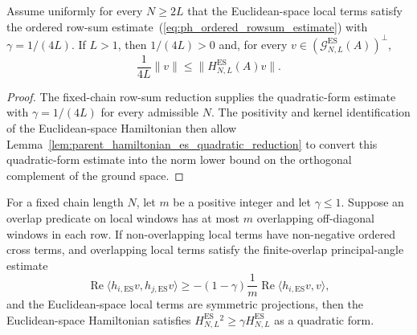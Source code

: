 \begin{lemma}
    \label{lem:parent_hamiltonian_ordered_rowsum_gap}
    \leanok
    Assume uniformly for every $N\ge2L$ that the Euclidean-space local terms
    satisfy the ordered row-sum estimate~(\ref{eq:ph_ordered_rowsum_estimate})
    with $\gamma=1/(4L)$. If $L>1$, then
    $1/(4L)>0$ and, for every
    $v\in(\mathcal G_{N,L}^{\mathrm{ES}}(A))^\perp$,
    \[
        \frac{1}{4L}\|v\|\le
        \|H_{N,L}^{\mathrm{ES}}(A)v\|.
    \]
\end{lemma}

\begin{proof}
    \leanok
    The fixed-chain row-sum reduction supplies the quadratic-form estimate with
    $\gamma=1/(4L)$ for every admissible $N$. The positivity and kernel
    identification of the Euclidean-space Hamiltonian then allow
    Lemma~\ref{lem:parent_hamiltonian_es_quadratic_reduction} to convert this
    quadratic-form estimate into the norm lower bound on the orthogonal
    complement of the ground space.
\end{proof}

\begin{lemma}
    \label{lem:parent_hamiltonian_finite_overlap_friedrichs_quadratic}
    \leanok
    For a fixed chain length $N$, let $m$ be a positive integer and let
    $\gamma\le1$. Suppose an overlap predicate on local windows has at most $m$
    overlapping off-diagonal windows in each row. If non-overlapping local terms
    have non-negative ordered cross terms, and overlapping local terms satisfy
    the finite-overlap principal-angle estimate
    \[
        \operatorname{Re}\langle h_{i,\mathrm{ES}}v,h_{j,\mathrm{ES}}v\rangle
        \ge -(1-\gamma)\frac{1}{m}
        \operatorname{Re}\langle h_{i,\mathrm{ES}}v,v\rangle,
    \]
    and the Euclidean-space local terms are symmetric projections, then the
    Euclidean-space Hamiltonian satisfies $H_{N,L}^{\mathrm{ES}}{}^2\ge
        \gamma H_{N,L}^{\mathrm{ES}}$ as a quadratic form.
\end{lemma}

